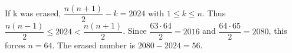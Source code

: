 If k was erased, $\dfrac{n(n+1)}{2}-k=2024$ with $1\le k\le n$. Thus $\dfrac{n(n-1)}{2}\le2024<\dfrac{n(n+1)}{2}$. Since $\dfrac{63\cdot64}{2}=2016$ and $\dfrac{64\cdot65}{2}=2080$, this forces $n=64$. The erased number is $2080-2024=\boxed{56}$.
